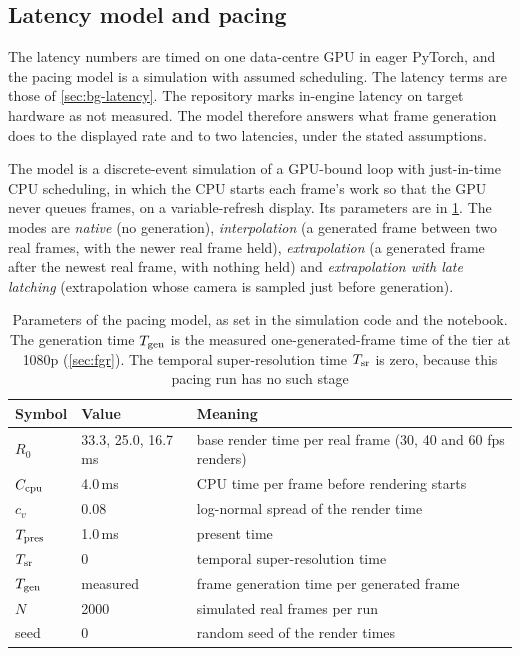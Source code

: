 \subsection{Latency model and pacing}\label{sec:fgm-pacing}

\UnderRevision{} The latency numbers are timed on one data-centre GPU in eager PyTorch, and the pacing model is a simulation with assumed scheduling. The latency terms are those of \cref{sec:bg-latency}. The repository marks in-engine latency on target hardware as not measured. The model therefore answers what frame generation does to the displayed rate and to two latencies, under the stated assumptions.

The model is a discrete-event simulation of a GPU-bound loop with just-in-time CPU scheduling, in which the CPU starts each frame's work so that the GPU never queues frames, on a variable-refresh display. Its parameters are in \cref{tab:fgm-pacing}. The modes are \emph{native} (no generation), \emph{interpolation} (a generated frame between two real frames, with the newer real frame held), \emph{extrapolation} (a generated frame after the newest real frame, with nothing held) and \emph{extrapolation with late latching} (extrapolation whose camera is sampled just before generation).

\begin{table}[!htbp]
\caption{Parameters of the pacing model, as set in the simulation code and the notebook. The generation time $T_{\rm gen}$ is the measured one-generated-frame time of the  tier at 1080p (\cref{sec:fgr}). The temporal super-resolution time $T_{\rm sr}$ is zero, because this pacing run has no such stage}\label{tab:fgm-pacing}
\begin{tabular*}{\textwidth}{@{\extracolsep\fill}lll}
\toprule
Symbol & Value & Meaning \\
\midrule
$R_0$ & 33.3, 25.0, 16.7\,ms & base render time per real frame (30, 40 and 60 fps renders) \\
$C_{\rm cpu}$ & 4.0\,ms & CPU time per frame before rendering starts \\
$c_v$ & 0.08 & log-normal spread of the render time \\
$T_{\rm pres}$ & 1.0\,ms & present time \\
$T_{\rm sr}$ & 0 & temporal super-resolution time \\
$T_{\rm gen}$ & measured & frame generation time per generated frame \\
$N$ & 2000 & simulated real frames per run \\
seed & 0 & random seed of the render times \\
\bottomrule
\end{tabular*}
\end{table}

